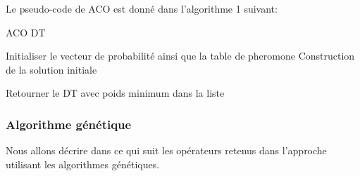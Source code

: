 \begin{enumerate}
Le pseudo-code de ACO est donné dans l’algorithme 1 suivant:

\begin{algorithm}[H]
\caption{ACO DT}
\SetAlgoLined
\DontPrintSemicolon

Initialiser le vecteur de probabilité ainsi que la table de pheromone \;
Construction de la solution initiale \;

Retourner le DT avec poids minimum dans la liste \;
\end{algorithm}
	
\end{enumerate}



\subsubsection{Algorithme génétique}
Nous allons décrire dans ce qui suit les opérateurs retenus dans l'approche utilisant les algorithmes génétiques. 


